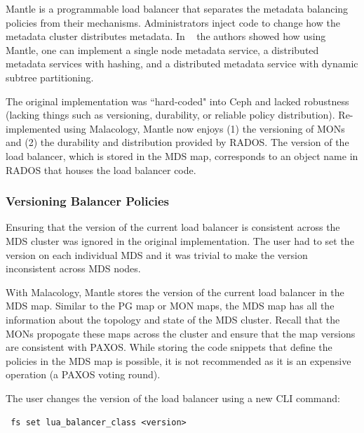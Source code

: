 \documentclass[10pt,twocolumn]{article}
\begin{document}
Mantle is a programmable load balancer that separates the metadata balancing
policies from their mechanisms. Administrators inject code to change how the
metadata cluster distributes metadata. In ~\cite{sevilla:sc15-mantle} the
authors showed how using Mantle, one can implement a single node metadata
service, a distributed metadata services with hashing, and a distributed
metadata service with dynamic subtree partitioning. 

The original implementation was ``hard-coded" into Ceph and lacked robustness
(lacking things such as versioning, durability, or reliable policy
distribution).  Re-implemented using Malacology, Mantle now enjoys (1) the
versioning of MONs and (2) the durability and distribution provided by RADOS.
The version of the load balancer, which is stored in the MDS map, corresponds
to an object name in RADOS that houses the load balancer code.

\subsubsection{Versioning Balancer Policies}

Ensuring that the version of the current load balancer is consistent across the
MDS cluster was ignored in the original implementation. The user had to set the
version on each individual MDS and it was trivial to make the version
inconsistent across MDS nodes.

With Malacology, Mantle stores the version of the current load balancer in the
MDS map.  Similar to the PG map or MON maps, the MDS map has all the
information about the topology and state of the MDS cluster.  Recall that the
MONs propogate these maps across the cluster and ensure that the map versions
are consistent with PAXOS.  While storing the code snippets that define the
policies in the MDS map is possible, it is not recommended as it is an
expensive operation (a PAXOS voting round).

The user changes the version of the load balancer using a new CLI command:

\noindent \texttt{ fs\ set\ lua\_balancer\_class\ \textless{}version\textgreater{}}

\end{document}
